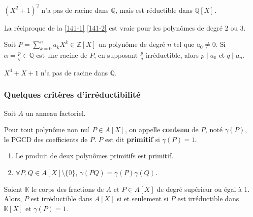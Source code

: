   \begin{cexample}
    $(X^2+1)^2$ n'a pas de racine dans $\mathbb{Q}$, mais est réductible dans $\mathbb{Q}[X]$.
  \end{cexample}

  \begin{proposition}
    La réciproque de la \cref{141-1} \cref{141-2} est vraie pour les polynômes de degré $2$ ou $3$.
  \end{proposition}

  \begin{proposition}
    Soit $P = \sum_{k=0}^n a_k X^k \in \mathbb{Z}[X]$ un polynôme de degré $n$ tel que $a_0 \neq 0$. Si $\alpha = \frac{p}{q} \in \mathbb{Q}$ est une racine de $P$, en supposant $\frac{p}{q}$ irréductible, alors $p \mid a_0$ et $q \mid a_n$.
  \end{proposition}


  \begin{example}
    $X^3 + X + 1$ n'a pas de racine dans $\mathbb{Q}$.
  \end{example}

  \subsubsection{Quelques critères d'irréductibilité}

  Soit $A$ un anneau factoriel.


  \begin{definition}
    Pour tout polynôme non nul $P \in A[X]$, on appelle \textbf{contenu} de $P$, noté $\gamma(P)$, le PGCD des coefficients de $P$. $P$ est dit \textbf{primitif} si $\gamma(P) = 1$.
  \end{definition}

  \begin{lemma}
    \begin{enumerate}[label={\bfseries(\roman*)}]
      \item Le produit de deux polynômes primitifs est primitif.
      \item $\forall P, Q \in A[X] \setminus \{ 0 \}$, $\gamma(PQ) = \gamma(P) \gamma(Q)$.
    \end{enumerate}
  \end{lemma}

  \begin{theorem}
    Soient $\mathbb{K}$ le corps des fractions de $A$ et $P \in A[X]$ de degré supérieur ou égal à $1$. Alors, $P$ est irréductible dans $A[X]$ si et seulement si $P$ est irréductible dans $\mathbb{K}[X]$ et $\gamma(P)=1$.
  \end{theorem}

